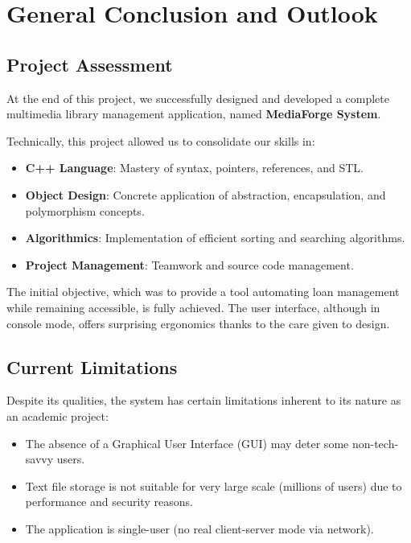 \documentclass[12pt,a4paper]{report}
\begin{document}
\chapter{General Conclusion and Outlook}

\section{Project Assessment}
At the end of this project, we successfully designed and developed a complete multimedia library management application, named \textbf{MediaForge System}.

Technically, this project allowed us to consolidate our skills in:
\begin{itemize}
    \item \textbf{C++ Language}: Mastery of syntax, pointers, references, and STL.
    \item \textbf{Object Design}: Concrete application of abstraction, encapsulation, and polymorphism concepts.
    \item \textbf{Algorithmics}: Implementation of efficient sorting and searching algorithms.
    \item \textbf{Project Management}: Teamwork and source code management.
\end{itemize}

The initial objective, which was to provide a tool automating loan management while remaining accessible, is fully achieved. The user interface, although in console mode, offers surprising ergonomics thanks to the care given to design.

\section{Current Limitations}
Despite its qualities, the system has certain limitations inherent to its nature as an academic project:
\begin{itemize}
    \item The absence of a Graphical User Interface (GUI) may deter some non-tech-savvy users.
    \item Text file storage is not suitable for very large scale (millions of users) due to performance and security reasons.
    \item The application is single-user (no real client-server mode via network).
\end{itemize}
\end{document}
